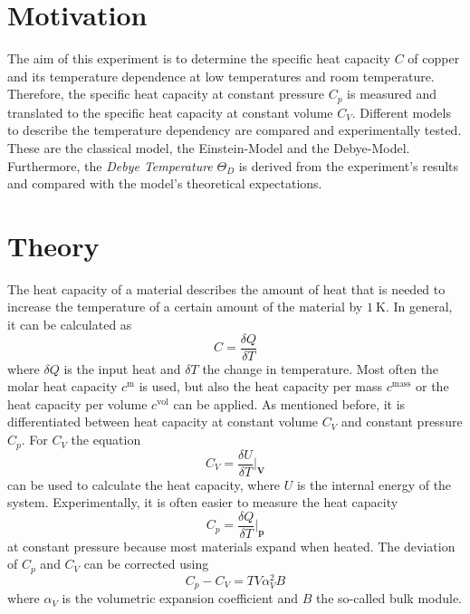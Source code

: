 \section{Motivation}
\label{sec:Motivation}
The aim of this experiment is to determine the specific heat capacity $C$ of copper and its temperature dependence at low temperatures and room temperature.
Therefore, the specific heat capacity at constant pressure $C_p$ is measured and translated to the specific heat capacity at constant volume $C_V$.
Different models to describe the temperature dependency are compared and experimentally tested. These are the classical model, the Einstein-Model and the Debye-Model.
Furthermore, the \textit{Debye Temperature} $\Theta_D$ is
derived from the experiment's results and compared with the model's theoretical expectations.

\section{Theory}
\label{sec:Theory}
The heat capacity of a material describes the amount of heat that is needed to increase the temperature of a certain amount of the material by $\qty{1}{\kelvin}$.
In general, it can be calculated as
\begin{equation*}
    C = \frac{\delta Q}{\delta T}
\end{equation*}
where $\delta Q$ is the input heat and $\delta T$ the change in temperature.
Most often the molar heat capacity $c^\text{m}$ is used, but also the heat capacity per mass $c^\text{mass}$ or the heat capacity per volume $c^\text{vol}$ can be applied.
As mentioned before, it is differentiated between heat capacity at constant volume $C_V$ and constant pressure $C_p$.
For $C_V$ the equation
\begin{equation}
    \label{eqn:CV}
    C_V = \frac{\delta U}{\delta T} \biggr\rvert_{\mathbf{V}}
\end{equation}
can be used to calculate the heat capacity, where $U$ is the internal energy of the system. Experimentally, it is often easier to measure the heat capacity
\begin{equation*}
    C_p = \frac{\delta Q}{\delta T} \biggr\rvert_{\mathbf{p}}
\end{equation*}
at constant pressure because most materials expand when heated.
The deviation of $C_p$ and $C_V$ can be corrected using
\begin{equation}
    \label{eqn:Cp_CV}
    C_p - C_V = T V \alpha^2_V B
\end{equation}
where $\alpha_V$ is the volumetric expansion coefficient and $B$ the so-called bulk module.

